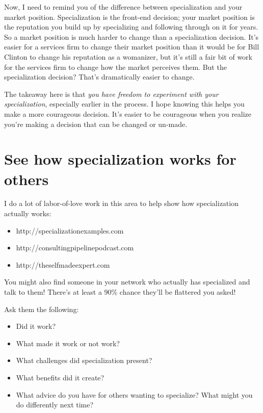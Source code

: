 Now, I need to remind you of the difference between specialization and your market position. Specialization is the front-end decision; your market position is the reputation you build up by specializing and following through on it for years. So a market position is much harder to change than a specialization decision. It's easier for a services firm to change their market position than it would be for Bill Clinton to change his reputation as a womanizer, but it's still a fair bit of work for the services firm to change how the market perceives them. But the specialization decision? That's dramatically easier to change.

The takeaway here is that \emph{you have freedom to experiment with your specialization}, especially earlier in the process. I hope knowing this helps you make a more courageous decision. It's easier to be courageous when you realize you're making a decision that can be changed or un-made.

\section{See how specialization works for others}

I do a lot of labor-of-love work in this area to help show how specialization actually works:

\begin{itemize}
\item http://specializationexamples.com
\item http://consultingpipelinepodcast.com
\item http://theselfmadeexpert.com
\end{itemize}

You might also find someone in your network who actually has specialized and talk to them! There's at least a 90\% chance they'll be flattered you asked!

Ask them the following:

\begin{itemize}
\item Did it work?
\item What made it work or not work?
\item What challenges did specialization present?
\item What benefits did it create?
\item What advice do you have for others wanting to specialize? What might you do differently next time?
\end{itemize}


